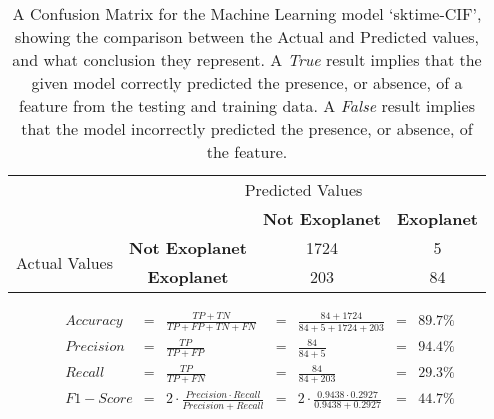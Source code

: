 
    \renewcommand{\arraystretch}{2}
    \renewcommand{\tabcolsep}{20.25pt}
    \vspace{-0.5cm}
    \begin{table}[ht]
    \begin{tabular}{cccc}
     & \multicolumn{3}{c}{Predicted Values} \\ \cline{3-4}
     & \multicolumn{1}{c|}{} & \multicolumn{1}{c|}{\textbf{Not Exoplanet}} & \multicolumn{1}{c|}{\textbf{Exoplanet}} \\ \cline{2-4}
    \multicolumn{1}{c|}{\multirow{2}{2.0cm}{Actual Values}} & \multicolumn{1}{c|}{\textbf{Not Exoplanet}} & \multicolumn{1}{c|}{1724} & \multicolumn{1}{c|}{5} \\ \cline{2-4}
    \multicolumn{1}{c|}{} & \multicolumn{1}{c|}{\textbf{Exoplanet}} & \multicolumn{1}{c|}{203} & \multicolumn{1}{c|}{84} \\ \cline{2-4}
    \end{tabular}
    \caption{A Confusion Matrix for the Machine Learning model `sktime-CIF', showing the comparison between the Actual and Predicted values, and what conclusion they represent. A \emph{True} result implies that the given model correctly predicted the presence, or absence, of a feature from the testing and training data. A \emph{False} result implies that the model incorrectly predicted the presence, or absence, of the feature.}
    \label{tab:sktime-CIFconfusionmatrix}
    \end{table}
    \vspace{-0.75cm}
    \label{eq:metrics-sktime-CIF}
    \begin{align*}
        Accuracy &= &\frac{TP + TN}{TP + FP + TN + FN} &= &\frac{84 + 1724}{84 + 5 + 1724 + 203} &= & 89.7\% \\
        Precision &= &\frac{TP}{TP + FP} &= &\frac{84}{84 + 5} &= & 94.4\% \\
        Recall &= &\frac{TP}{TP + FN} &= &\frac{84}{84 + 203} &= & 29.3\% \\
        F1-Score &= &2 \cdot \frac{Precision \cdot Recall}{Precision + Recall} &= &2 \cdot \frac{0.9438 \cdot 0.2927}{0.9438 + 0.2927} &= & 44.7\% \\
    \end{align*}
    \vspace{-1.75cm}
    \renewcommand{\arraystretch}{1}
    \renewcommand{\tabcolsep}{5.25pt}
    